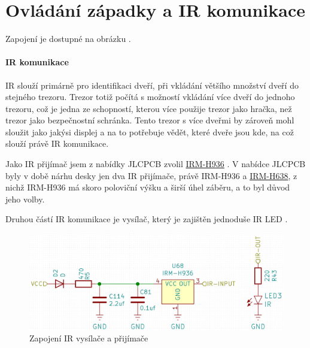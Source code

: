 \section{Ovládání západky a IR komunikace}

Zapojení je dostupné na obrázku .

\paragraph{IR komunikace}
IR slouží primárně pro identifikaci dveří, při vkládání většího množství dveří do stejného trezoru.
Trezor totiž počítá s možností vkládání více dveří do jednoho trezoru, což je jedna ze schopností, kterou více použije trezor jako hračka, než trezor jako bezpečnostní schránka.
Tento trezor s více dveřmi by zároveň mohl sloužit jako jakýsi displej a na to potřebuje vědět, které dveře jsou kde, na což slouží právě IR komunikace. %

Jako IR přijímač jsem z nabídky JLCPCB \parencite{JLCPCB} zvolil \href{https://datasheet.lcsc.com/szlcsc/1912111437_Everlight-Elec-IRM-H936-TR2_C264266.pdf}{IRM-H936} \parencite{irm-h936}. 
V nabídce JLCPCB byly v době nárhu desky jen dva IR při\-jí\-ma\-če, právě IRM-H936 a \href{https://datasheet.lcsc.com/szlcsc/2010221806_Everlight-Elec-IRM-H638T-TR2-DX_C390031.pdf}{IRM-H638},
z nichž IRM-H936 má skoro poloviční výšku a širší úhel záběru, a to byl důvod jeho volby.

Druhou částí IR komunikace je vysílač, který je zajištěn jednoduše IR LED \parencite{ir19-21c/tr8}.

\begin{figure}[htbp]
    \centering
    \includegraphics[width=\textwidth]{kapitoly/obrazky/E4/ir_motor_enkoder/IR.png}
    \caption{Zapojení IR vysílače a přijímače}
    \label{fig:E4-ir}
\end{figure}

\newpage

